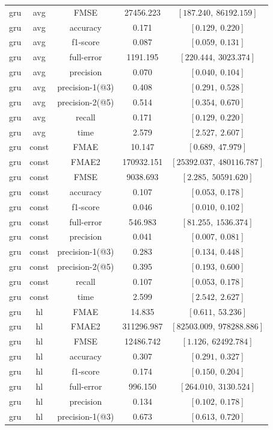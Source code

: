 \begin{center}
\begin{longtable}{|c|c|c|c|c|}
gru & avg & FMSE & 27456.223 & $[187.240,\ 86192.159]$ \\
gru & avg & accuracy & 0.171 & $[0.129,\ 0.220]$ \\
gru & avg & f1-score & 0.087 & $[0.059,\ 0.131]$ \\
gru & avg & full-error & 1191.195 & $[220.444,\ 3023.374]$ \\
gru & avg & precision & 0.070 & $[0.040,\ 0.104]$ \\
gru & avg & precision-1(@3) & 0.408 & $[0.291,\ 0.528]$ \\
gru & avg & precision-2(@5) & 0.514 & $[0.354,\ 0.670]$ \\
gru & avg & recall & 0.171 & $[0.129,\ 0.220]$ \\
gru & avg & time & 2.579 & $[2.527,\ 2.607]$ \\
\hline
gru & const & FMAE & 10.147 & $[0.689,\ 47.979]$ \\
gru & const & FMAE2 & 170932.151 & $[25392.037,\ 480116.787]$ \\
gru & const & FMSE & 9038.693 & $[2.285,\ 50591.620]$ \\
gru & const & accuracy & 0.107 & $[0.053,\ 0.178]$ \\
gru & const & f1-score & 0.046 & $[0.010,\ 0.102]$ \\
gru & const & full-error & 546.983 & $[81.255,\ 1536.374]$ \\
gru & const & precision & 0.041 & $[0.007,\ 0.081]$ \\
gru & const & precision-1(@3) & 0.283 & $[0.134,\ 0.448]$ \\
gru & const & precision-2(@5) & 0.395 & $[0.193,\ 0.600]$ \\
gru & const & recall & 0.107 & $[0.053,\ 0.178]$ \\
gru & const & time & 2.599 & $[2.542,\ 2.627]$ \\
\hline
gru & hl & FMAE & 14.835 & $[0.611,\ 53.236]$ \\
gru & hl & FMAE2 & 311296.987 & $[82503.009,\ 978288.886]$ \\
gru & hl & FMSE & 12486.742 & $[1.126,\ 62492.784]$ \\
gru & hl & accuracy & 0.307 & $[0.291,\ 0.327]$ \\
gru & hl & f1-score & 0.174 & $[0.150,\ 0.204]$ \\
gru & hl & full-error & 996.150 & $[264.010,\ 3130.524]$ \\
gru & hl & precision & 0.134 & $[0.102,\ 0.178]$ \\
gru & hl & precision-1(@3) & 0.673 & $[0.613,\ 0.720]$ \\

\end{longtable}
\end{center}
